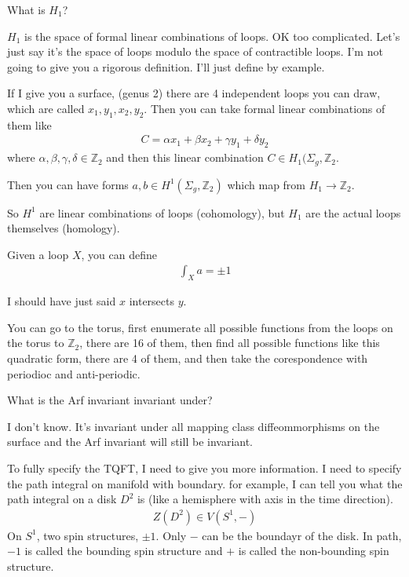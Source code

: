 \begin{question}
    What is $H_1$?
\end{question}
$H_1$ is the space of formal linear combinations of loops.
OK too complicated.
Let's just say it's the space of loops modulo the space of contractible loops.
I'm not going to give you a rigorous definition.
I'll just define by example.

If I give you a surface, (genus 2)
there are 4 independent loops you can draw,
which are called $x_1,y_1,x_2,y_2$.
Then you can take formal linear combinations of them like
\begin{align}
    C = \alpha x_1 + \beta x_2 + \gamma y_1 + \delta y_2
\end{align}
where $\alpha,\beta,\gamma,\delta\in \mathbb{Z}_2$
and then this linear combination
$C\in H_1(\Sigma_g, \mathbb{Z}_2$.

Then you can have forms $a,b\in H^1(\Sigma_g, \mathbb{Z}_2)$
which map from $H_1\to \mathbb{Z}_2$.

So $H^1$ are linear combinations of loops (cohomology),
but $H_1$ are the actual loops themselves (homology).

Given a loop $X$,
you can define
\begin{align}
    \int_X a = \pm 1
\end{align}

I should have just said $x$ intersects $y$.

You can go to the torus,
first enumerate all possible functions from the loops on the torus to
$\mathbb{Z}_2$,
there are 16 of them,
then find all possible functions like this quadratic form,
there are 4 of them,
and then take the corespondence with periodioc and anti-periodic.

\begin{question}
    What is the Arf invariant invariant under?
\end{question}
I don't know.
It's invariant under all mapping class diffeommorphisms on the surface and the
Arf invariant will still be invariant.

To fully specify the TQFT,
I need to give you more information.
I need to specify the path integral on manifold with boundary.
for example,
I can tell you what the path integral on a disk $D^2$ is
(like a hemisphere with axis in the time direction).
\begin{align}
    Z(D^2) \in V(S^1, -)
\end{align}
On $S^1$,
two spin structures, $\pm 1$.
Only $-$ can be the boundayr of the disk.
In path, $-1$ is called the bounding spin structure
and $+$ is called the non-bounding spin structure.

